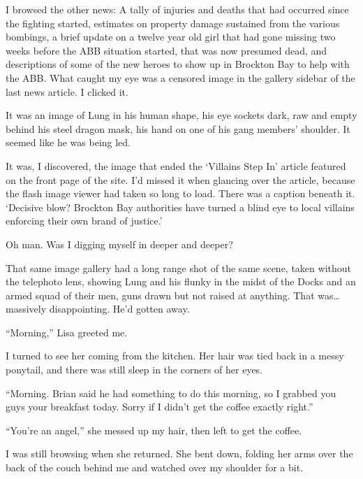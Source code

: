 I browsed the other news:  A tally of injuries and deaths that had occurred since the fighting started, estimates on property damage sustained from the various bombings, a brief update on a twelve year old girl that had gone missing two weeks before the ABB situation started, that was now presumed dead, and descriptions of some of the new heroes to show up in Brockton Bay to help with the ABB.  What caught my eye was a censored image in the gallery sidebar of the last news article.  I clicked it.



It was an image of Lung in his human shape, his eye sockets dark, raw and empty behind his steel dragon mask, his hand on one of his gang members' shoulder.  It seemed like he was being led.



It was, I discovered, the image that ended the `Villains Step In' article featured on the front page of the site.  I'd missed it when glancing over the article, because the flash image viewer had taken so long to load.  There was a caption beneath it.  `Decisive blow?  Brockton Bay authorities have turned a blind eye to local villains enforcing their own brand of justice.'



Oh man.  Was I digging myself in deeper and deeper?



That same image gallery had a long range shot of the same scene, taken without the telephoto lens, showing Lung and his flunky in the midst of the Docks and an armed squad of their men, guns drawn but not raised at anything.  That was\ldots massively disappointing.  He'd gotten away.



``Morning,'' Lisa greeted me.



I turned to see her coming from the kitchen.  Her hair was tied back in a messy ponytail, and there was still sleep in the corners of her eyes.



``Morning.  Brian said he had something to do this morning, so I grabbed you guys your breakfast today.  Sorry if I didn't get the coffee exactly right.''



``You're an angel,'' she messed up my hair, then left to get the coffee.



I was still browsing when she returned.  She bent down, folding her arms over the back of the couch behind me and watched over my shoulder for a bit.



